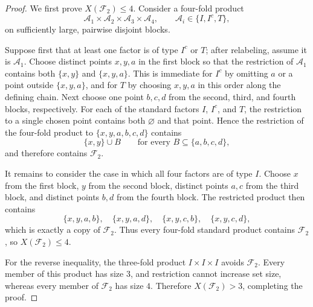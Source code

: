 \documentclass[10pt,a4paper]{amsart}
\newcommand{\cF}{\mathcal F}
\begin{document}
	\begin{proof}
		We first prove $X(\cF_2)\le 4$. Consider a four-fold product
		\[
		\mathcal A_1\times\mathcal A_2\times\mathcal A_3\times\mathcal A_4,
		\qquad
		\mathcal A_i\in\{I,I^c,T\},
		\]
		on sufficiently large, pairwise disjoint blocks.
		
		Suppose first that at least one factor is of type $I^c$ or $T$; after
		relabeling, assume it is $\mathcal A_1$. Choose distinct points
		$x,y,a$ in the first block so that the restriction of $\mathcal A_1$ contains
		both $\{x,y\}$ and $\{x,y,a\}$. This is immediate for $I^c$ by omitting $a$
		or a point outside $\{x,y,a\}$, and for $T$ by choosing $x,y,a$ in this order
		along the defining chain. Next choose one point $b,c,d$ from the second,
		third, and fourth blocks, respectively. For each of the standard factors
		$I$, $I^c$, and $T$, the restriction to a single chosen point contains both
		$\varnothing$ and that point. Hence the restriction of the four-fold product
		to $\{x,y,a,b,c,d\}$ contains
		\[
		\{x,y\}\cup B
		\qquad\text{for every }B\subseteq\{a,b,c,d\},
		\]
		and therefore contains $\cF_2$.
		
		It remains to consider the case in which all four factors are of type $I$.
		Choose $x$ from the first block, $y$ from the second block, distinct points
		$a,c$ from the third block, and distinct points $b,d$ from the fourth block.
		The restricted product then contains
		\[
		\{x,y,a,b\},\quad
		\{x,y,a,d\},\quad
		\{x,y,c,b\},\quad
		\{x,y,c,d\},
		\]
		which is exactly a copy of $\cF_2$. Thus every four-fold standard product
		contains $\cF_2$, so $X(\cF_2)\le 4$.
		
		For the reverse inequality, the three-fold product $I\times I\times I$
		avoids $\cF_2$. Every member of this product has size $3$, and restriction
		cannot increase set size, whereas every member of $\cF_2$ has size $4$.
		Therefore $X(\cF_2)>3$, completing the proof.
	\end{proof}
	
\end{document}
